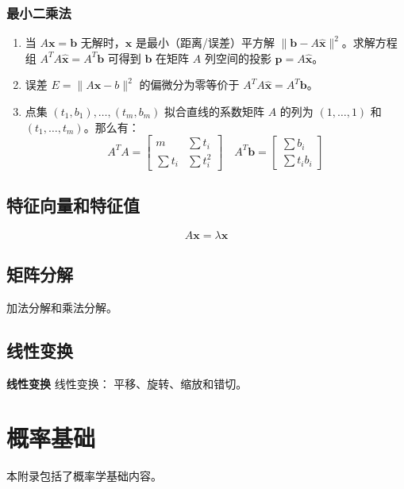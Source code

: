 \documentclass[cn,11pt,chinese,blue,bibstyle=ieeetr]{elegantbook}
\begin{document}
{\subsection{最小二乘法}

\begin{enumerate}
\item 当 $A\bm{x}=\bm{b}$ 无解时，$\bm{\widehat{x}}$ 是最小（距离/误差）平方解 $\|\bm{b}-A\widehat{\bm{x}}\|^2$。求解方程组 $A^TA\bm{\widehat{x}}=A^T\bm{b}$ 可得到 $\bm{b}$ 在矩阵 $A$ 列空间的投影 $\bm{p}=A\bm{\widehat{x}}$。
\item 误差 $E = \|A\bm{x}-b\|^2$ 的偏微分为零等价于 $A^TA\bm{\widehat{x}}=A^T\bm{b}$。
\item 点集 $\left(t_1,b_1\right), \dots , \left(t_m,b_m\right)$ 拟合直线的系数矩阵 $A$ 的列为 $\left(1, \dots, 1\right)$ 和 $\left(t_1, \dots, t_m\right)$。那么有：
\begin{equation}
A^TA = \begin{bmatrix}
m & \sum t_i \\
\sum t_i & \sum t_i^2
\end{bmatrix} \quad
A^T\bm{b} = \begin{bmatrix}
\sum b_i \\
\sum t_ib_i
\end{bmatrix}
\end{equation}
\end{enumerate}


\section{特征向量和特征值}

$$A\bm{x}=\lambda\bm{x}$$


\section{矩阵分解}
加法分解和乘法分解。


\section{线性变换}

\textbf{线性变换} 线性变换：
平移、旋转、缩放和错切。


\chapter{概率基础}


本附录包括了概率学基础内容。

}
\end{document}
